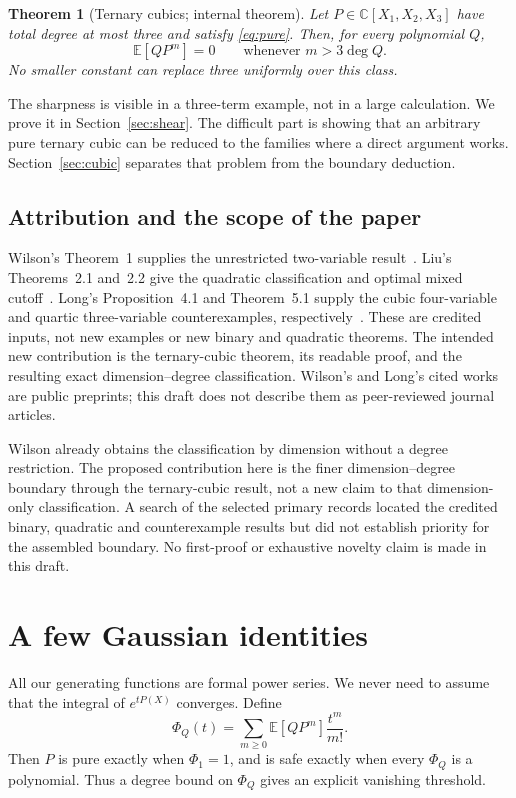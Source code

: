 \documentclass[11pt]{article}
\newtheorem{theorem}{Theorem}[section]
\theoremstyle{definition}\newtheorem{definition}[theorem]{Definition}
\theoremstyle{remark}\newtheorem{remark}[theorem]{Remark}
\newcommand{\E}{\mathbb E}
\newcommand{\C}{\mathbb C}
\begin{document}
\begin{theorem}[Ternary cubics; internal theorem]\label{thm:cubic}
Let $P\in\C[X_1,X_2,X_3]$ have total degree at most three and satisfy
\eqref{eq:pure}. Then, for every polynomial $Q$,
\begin{equation}\label{eq:cutoff}
 \E[QP^m]=0\qquad\text{whenever }m>3\deg Q.
\end{equation}
No smaller constant can replace three uniformly over this class.
\end{theorem}

The sharpness is visible in a three-term example, not in a large
calculation. We prove it in Section~\ref{sec:shear}. The difficult part
is showing that an arbitrary pure ternary cubic can be reduced to the
families where a direct argument works. Section~\ref{sec:cubic} separates
that problem from the boundary deduction.

\subsection*{Attribution and the scope of the paper}
Wilson's Theorem~1 supplies the unrestricted two-variable
result~\cite{Wilson}. Liu's Theorems~2.1 and~2.2 give the quadratic classification and optimal
mixed cutoff~\cite{Liu}.
Long's Proposition~4.1 and Theorem~5.1 supply the cubic four-variable
and quartic three-variable counterexamples, respectively~\cite{Long}. These are
credited inputs, not new examples or new binary and quadratic theorems.
The intended new contribution is the ternary-cubic theorem, its readable
proof, and the resulting exact dimension--degree classification.
Wilson's and Long's cited works are public preprints; this draft does
not describe them as peer-reviewed journal articles.

Wilson already obtains the classification by dimension without a degree
restriction. The proposed contribution here is the finer dimension--degree
boundary through the ternary-cubic result, not a new claim to that
dimension-only classification. A search of the selected primary records
located the credited binary, quadratic and counterexample results but
did not establish priority for the assembled boundary. No first-proof
or exhaustive novelty claim is made in this draft.


\section{A few Gaussian identities}

All our generating functions are formal power series. We never need to
assume that the integral of $e^{tP(X)}$ converges. Define
\begin{equation}\label{eq:phi}
 \Phi_Q(t)=\sum_{m\geq0}\E[QP^m]\frac{t^m}{m!}.
\end{equation}
Then $P$ is pure exactly when $\Phi_1=1$, and is safe exactly when
every $\Phi_Q$ is a polynomial. Thus a degree bound on $\Phi_Q$ gives
an explicit vanishing threshold.
\end{document}
